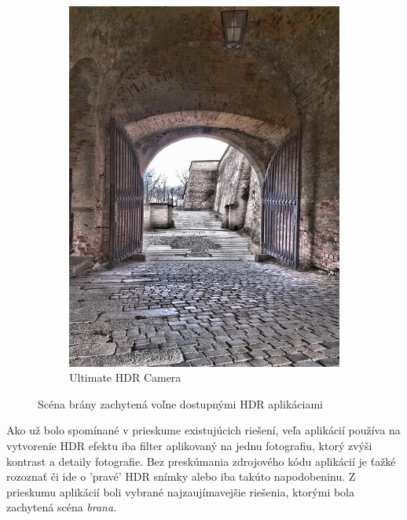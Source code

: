 \begin{figure}[h!]
\begin{subfigure}{0.3\textwidth}
        \includegraphics[width=\textwidth]{figures/tests/hdrApps/ultimateHdrCamera}
        \caption{Ultimate HDR Camera}
        \label{fig:apps_4}
    \end{subfigure}
    \caption{Scéna brány zachytená voľne dostupnými HDR aplikáciami}
    \label{fig:apps}
\end{figure}

Ako už bolo spomínané v prieskume existujúcich riešení, veľa aplikácií používa na vytvorenie HDR efektu
iba filter aplikovaný na jednu fotografiu, ktorý zvýši kontrast a detaily fotografie. Bez preskúmania
zdrojového kódu aplikácií je ťažké rozoznať či ide o 'pravé' HDR snímky alebo iba takúto napodobeninu.
Z prieskumu aplikácií boli vybrané najzaujímavejšie riešenia, ktorými bola zachytená scéna \textit{brana}.

